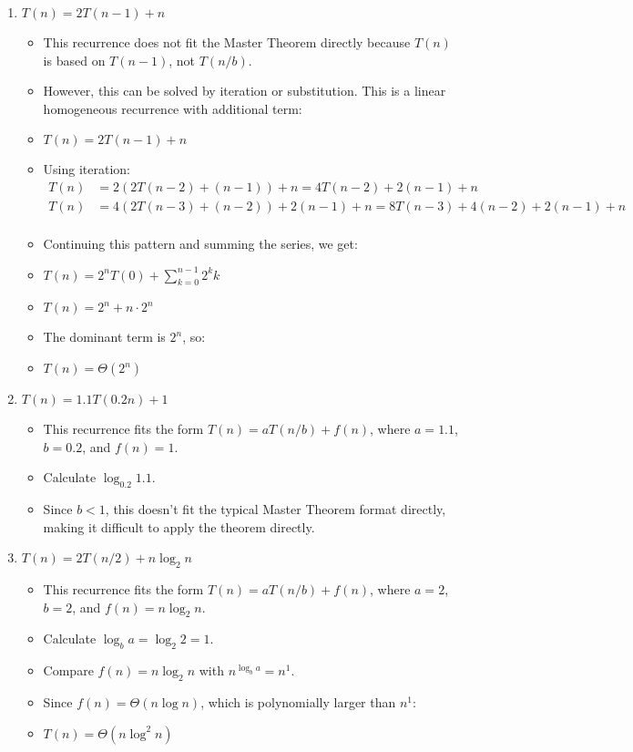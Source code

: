 \documentclass{article}
\begin{document}
\begin{enumerate}[label=(\alph*)]
    \item \( T(n) = 2T(n-1) + n \)
    \begin{itemize}
        \item This recurrence does not fit the Master Theorem directly because \( T(n) \) is based on \( T(n-1) \), not \( T(n/b) \).
        \item However, this can be solved by iteration or substitution. This is a linear homogeneous recurrence with additional term:
        \item \( T(n) = 2T(n-1) + n \)
        \item Using iteration:
        \begin{align*}
            T(n) &= 2(2T(n-2) + (n-1)) + n = 4T(n-2) + 2(n-1) + n \\
            T(n) &= 4(2T(n-3) + (n-2)) + 2(n-1) + n = 8T(n-3) + 4(n-2) + 2(n-1) + n \\
        \end{align*}
        \item Continuing this pattern and summing the series, we get:
        \item \( T(n) = 2^n T(0) + \sum_{k=0}^{n-1} 2^k k \)
        \item \( T(n) = 2^n + n \cdot 2^n \)
        \item The dominant term is \( 2^n \), so:
        \item \( T(n) = \Theta(2^n) \)
    \end{itemize}

    \item \( T(n) = 1.1T(0.2n) + 1 \)
    \begin{itemize}
        \item This recurrence fits the form \( T(n) = aT(n/b) + f(n) \), where \( a = 1.1 \), \( b = 0.2 \), and \( f(n) = 1 \).
        \item Calculate \( \log_{0.2}{1.1} \).
        \item Since \( b < 1 \), this doesn't fit the typical Master Theorem format directly, making it difficult to apply the theorem directly.
    \end{itemize}

    \item \( T(n) = 2T(n/2) + n \log_2 n \)
    \begin{itemize}
        \item This recurrence fits the form \( T(n) = aT(n/b) + f(n) \), where \( a = 2 \), \( b = 2 \), and \( f(n) = n \log_2 n \).
        \item Calculate \( \log_b{a} = \log_2{2} = 1 \).
        \item Compare \( f(n) = n \log_2 n \) with \( n^{\log_b{a}} = n^1 \).
        \item Since \( f(n) = \Theta(n \log n) \), which is polynomially larger than \( n^1 \):
        \item \( T(n) = \Theta(n \log^2 n) \)
    \end{itemize}


\end{enumerate}
\end{document}
